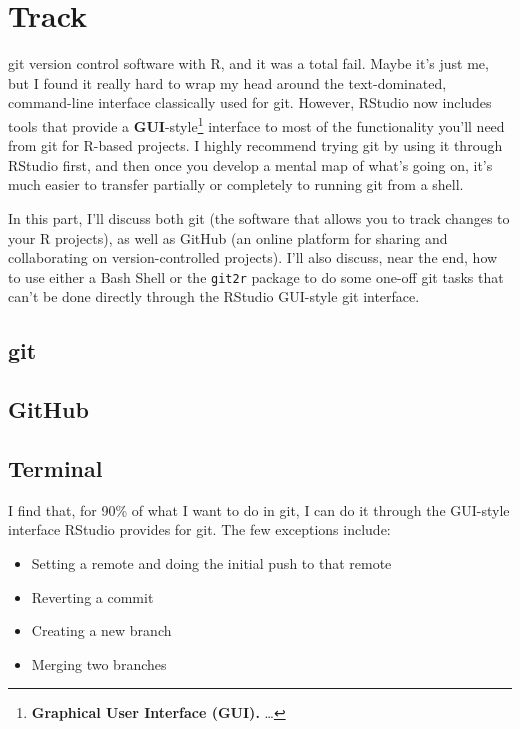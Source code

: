 \documentclass[]{tufte-book}
\providecommand{\tightlist}{%
  \setlength{\itemsep}{0pt}\setlength{\parskip}{0pt}}
\begin{document}
\hypertarget{track}{%
\chapter{Track}\label{track}}

 git version control software with R, and
it was a total fail. Maybe it's just me, but I found it really hard to wrap my head around
the text-dominated, command-line interface classically used for git. However, RStudio now
includes tools that provide a \textbf{GUI}-style\footnote{\textbf{Graphical User Interface (GUI).} \ldots{}}
interface to most of the functionality you'll need from git for R-based projects. I highly
recommend trying git by using it through RStudio first, and then once you develop a mental
map of what's going on, it's much easier to transfer partially or completely to running git
from a shell.

In this part, I'll discuss both git (the software that allows you to track changes to your
R projects), as well as GitHub (an online platform for sharing and collaborating on
version-controlled projects). I'll also discuss, near the end, how to use either a Bash
Shell or the \texttt{git2r} package to do some one-off git tasks that can't be done directly through
the RStudio GUI-style git interface.

\hypertarget{git}{%
\section{git}\label{git}}

\hypertarget{github}{%
\section{GitHub}\label{github}}

\hypertarget{terminal}{%
\section{Terminal}\label{terminal}}

I find that, for 90\% of what I want to do in git, I can do it through the GUI-style
interface RStudio provides for git. The few exceptions include:

\begin{itemize}
\tightlist
\item
  Setting a remote and doing the initial push to that remote
\item
  Reverting a commit
\item
  Creating a new branch
\item
  Merging two branches
\end{itemize}
\end{document}
